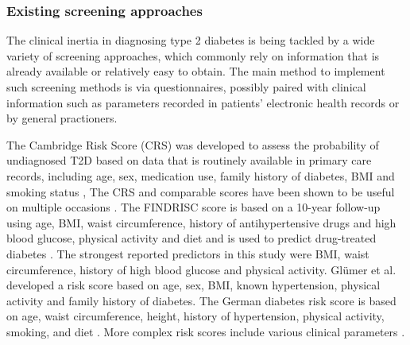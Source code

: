 \subsubsection{Existing screening approaches} \label{intro:screening-existing}
The clinical inertia in diagnosing type 2 diabetes is being tackled by a wide variety of screening approaches, which commonly rely on information that is already available or relatively easy to obtain. The main method to implement such screening methods is via questionnaires, possibly paired with clinical information such as parameters recorded in patients' electronic health records or by general practioners.

The Cambridge Risk Score (CRS) was developed to assess the probability of undiagnosed T2D based on data that is routinely available in primary care records, including age, sex, medication use, family history of diabetes, BMI and smoking status \citep{griffin2000diabetes}, The CRS and comparable scores have been shown to be useful on multiple occasions \citep{baan1999performance,griffin2000diabetes, park2002performance, spijkerman2004performance}. 
The FINDRISC score is based on a 10-year follow-up using age, BMI, waist circumference, history of antihypertensive drugs and high blood glucose, physical activity and diet and is used to predict drug-treated diabetes \citep{lindstrom2003diabetes}. The strongest reported predictors in this study were BMI, waist circumference, history of high blood glucose and physical activity. Gl{\"u}mer et al. \citep{glumer2004danish} developed a risk score based on age, sex, BMI, known hypertension, physical activity and family history of diabetes. The German diabetes risk score is based on age, waist circumference, height, history of hypertension, physical activity, smoking, and diet \citep{schulze2007accurate}.
More complex risk scores include various clinical parameters \citep{heikes2008diabetes, stern2002identification, mcneely2003comparison}.




